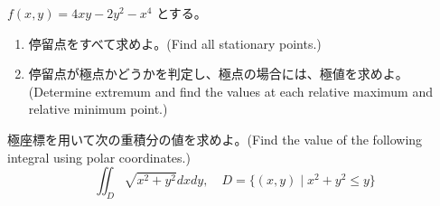 
\item $f(x,y) = 4xy - 2y^2 - x^4$ とする。
\begin{enumerate}
\item 停留点をすべて求めよ。(Find all stationary points.)
\item 停留点が極点かどうかを判定し、極点の場合には、極値を求めよ。(Determine extremum and find the values at each relative maximum and relative minimum point.)
\end{enumerate}

\item 極座標を用いて次の重積分の値を求めよ。(Find the value of the following integral using polar coordinates.)
$$\iint_D\sqrt{x^2+y^2}dxdy,\quad D = \{(x,y)\mid x^2 + y^2 \leq y\}$$
